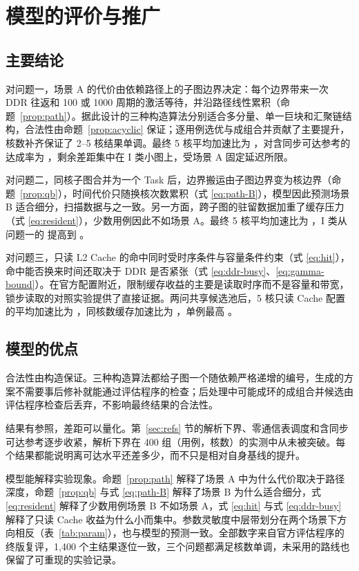 \section{模型的评价与推广}

\subsection{主要结论}

对问题一，场景 A 的代价由依赖路径上的子图边界决定：每个边界带来一次 DDR 往返和 100 或 1000 周期的激活等待，并沿路径线性累积（命题~\ref{prop:path}）。据此设计的三种构造算法分别适合多分量、单一巨块和汇聚链结构，合法性由命题~\ref{prop:acyclic} 保证；逐用例选优与成组合并贡献了主要提升，核数补齐保证了 2--5 核结果单调。最终 5 核平均加速比为 ，对含同步可达参考的达成率为 ，剩余差距集中在 I 类小图上，受场景 A 固定延迟所限。

对问题二，同核子图合并为一个 Task 后，边界搬运由子图边界变为核边界（命题~\ref{prop:qb}），时间代价只随换核次数累积（式 \eqref{eq:path-B}），模型因此预测场景 B 适合细分，扫描数据与之一致。另一方面，跨子图的驻留数据加重了缓存压力（式 \eqref{eq:resident}），少数用例因此不如场景 A。最终 5 核平均加速比为 ，I 类从问题一的  提高到 。

对问题三，只读 L2 Cache 的命中同时受时序条件与容量条件约束（式 \eqref{eq:hit}），命中能否换来时间还取决于 DDR 是否紧张（式 \eqref{eq:ddr-busy}、\eqref{eq:gamma-bound}）。在官方配置附近，限制缓存收益的主要是读取时序而不是容量和带宽，锁步读取的对照实验提供了直接证据。两问共享候选池后，5 核只读 Cache 配置的平均加速比为 ，同核数缓存加速比为 ，单例最高 。

\subsection{模型的优点}

合法性由构造保证。三种构造算法都给子图一个随依赖严格递增的编号，生成的方案不需要事后修补就能通过评估程序的检查；后处理中可能成环的成组合并候选由评估程序检查后丢弃，不影响最终结果的合法性。

结果有参照，差距可以量化。第~\ref{sec:refs} 节的解析下界、零通信表调度和含同步可达参考逐步收紧，解析下界在 400 组（用例，核数）的实测中从未被突破。每个结果都能说明离可达水平还差多少，而不只是相对自身基线的提升。

模型能解释实验现象。命题~\ref{prop:path} 解释了场景 A 中为什么代价取决于路径深度，命题~\ref{prop:qb} 与式 \eqref{eq:path-B} 解释了场景 B 为什么适合细分，式 \eqref{eq:resident} 解释了少数用例场景 B 不如场景 A，式 \eqref{eq:hit} 与式 \eqref{eq:ddr-busy} 解释了只读 Cache 收益为什么小而集中。参数灵敏度中层带划分在两个场景下方向相反（表~\ref{tab:param}），也与模型的预测一致。全部数字来自官方评估程序的终版复评，1{,}400 个主结果逐位一致，三个问题都满足核数单调，未采用的路线也保留了可重现的实验记录。

